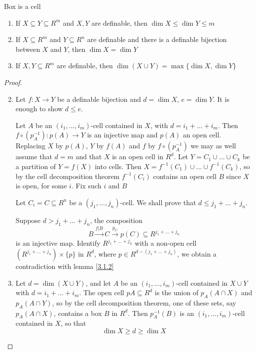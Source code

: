 \documentclass[11pt]{article}
\begin{document}
Box is a cell

\begin{proposition}[]
\begin{enumerate}
\item If \(X\subseteq Y\subseteq R^m\) and \(X,Y\) are definable, then \(\dim X\le\dim Y\le m\)
\item If \(X\subseteq R^m\) and \(Y\subseteq R^n\) are definable and there is a definable bijection between \(X\)
and \(Y\), then \(\dim X=\dim Y\)
\item If \(X,Y\subseteq R^m\) are definable, then \(\dim(X\cup Y)=\max\{\dim X,\dim Y\}\)
\end{enumerate}
\end{proposition}

\begin{proof}
\begin{enumerate}
\setcounter{enumi}{1}
\item Let \(f:X\to Y\) be a definable bijection and \(d=\dim X\), \(e=\dim Y\). It is enough to
show \(d\le e\).

Let \(A\) be an \((i_1,\dots,i_m)\)-cell contained in \(X\), with \(d=i_1+\dots+i_m\).
Then \(f\circ(p_A^{-1}):p(A)\to Y\) is an injective map and \(p(A)\) an open cell.
Replacing \(X\) by \(p(A)\), \(Y\) by \(f(A)\) and \(f\) by \(f\circ(p_A^{-1})\) we may as well
assume that \(d=m\) and that \(X\) is an open cell in \(R^d\). Let \(Y=C_1\cup\dots\cup C_k\) be a
partition of \(Y=f(X)\) into cells. Then \(X=f^{-1}(C_1)\cup\dots\cup f^{-1}(C_k)\), so by the cell
decomposition theorem  \(f^{-1}(C_i)\) contains an open cell \(B\) since \(X\) is open, for
some \(i\). Fix such \(i\) and \(B\)

Let \(C_i=C\subseteq R^n\) be a \((j_1,\dots,j_n)\)-cell. We shall prove that \(d\le j_1+\dots+j_n\).

Suppose \(d>j_1+\dots+j_n\), the composition
\begin{equation*}
B\xrightarrow{f|B}C\xrightarrow{p_C}p(C)\subseteq R^{j_1+\dots+j_n}
\end{equation*}
is an injective map. Identify \(R^{j_1+\dots+j_n}\) with a non-open cell \((R^{j_1+\dots+j_n})\times\{p\}\)
in \(R^d\), where \(p\in R^{d-(j_1+\dots+j_n)}\), we obtain a contradiction with lemma \ref{3.1.2}
\item Let \(d=\dim(X\cup Y)\), and let \(A\) be an \((i_1,\dots,i_m)\)-cell contained in \(X\cup Y\)
with \(d=i_1+\dots+i_m\). The open cell \(pA\subseteq R^d\) is the union of \(p_A(A\cap X)\)
and \(p_A(A\cap Y)\), so by the cell decomposition theorem, one of these sets,
say \(p_A(A\cap X)\), contains a box \(B\) in \(R^d\). Then \(p_A^{-1}(B)\) is
an \((i_1,\dots,i_m)\)-cell contained in \(X\), so that
\begin{equation*}
\dim X\ge d\ge \dim X
\end{equation*}
\end{enumerate}
\end{proof}
\end{document}
